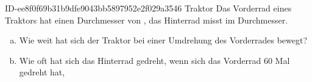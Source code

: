 \begin{exercise}
      {ID-ee8f0f69b31b9dfe9043bb5897952e2f029a3546}
      {Traktor}
  \ifproblem\problem
    Das Vorderrad eines Traktors hat einen Durchmesser von , das
    Hinterrad misst  im Durchmesser.
    \begin{enumerate}[a)]
      \item Wie weit hat sich der Traktor bei einer Umdrehung
            des Vorderrades bewegt?
      \item Wie oft hat sich das Hinterrad gedreht, wenn sich
            das Vorderrad 60 Mal gedreht hat,
    \end{enumerate}
  \fi
\end{exercise}

